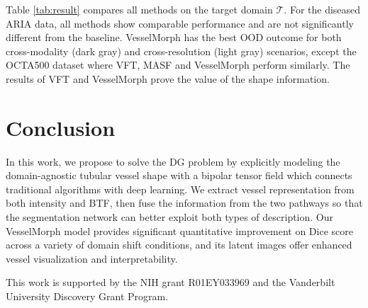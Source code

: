 \documentclass[runningheads]{llncs}
\begin{document}
Table \ref{tab:result} compares all methods on the target domain $\mathcal{T}$. For the diseased ARIA data, all methods show comparable performance and are not significantly different from the baseline. VesselMorph has the best OOD outcome for both cross-modality (dark gray) and cross-resolution (light gray) scenarios, except the OCTA500 dataset where VFT, MASF and VesselMorph perform similarly. The results of VFT and VesselMorph prove the value of the shape information.

\section{Conclusion}
In this work, we propose to solve the DG problem by explicitly modeling the domain-agnostic tubular vessel shape with a bipolar tensor field which connects traditional algorithms with deep learning. We extract vessel representation from both intensity and BTF, then fuse the information from the two pathways so that the segmentation network can better exploit both types of description. Our VesselMorph model provides significant quantitative improvement on Dice score across a variety of domain shift conditions, and its latent images offer enhanced vessel visualization and interpretability.   

 This work is supported by the NIH grant R01EY033969 and the Vanderbilt University Discovery Grant Program.



\end{document}
